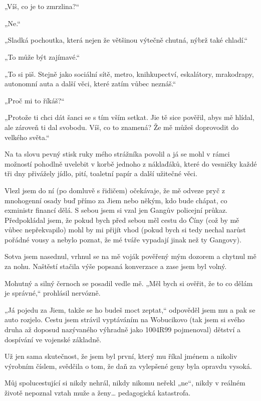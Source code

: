 \chapter{}

„Víš, co je to zmrzlina?“

„Ne.“

„Sladká pochoutka, která nejen že většinou výtečně chutná, nýbrž také chladí.“

„To může být zajímavé.“

„To si piš. Stejně jako sociální sítě, metro, knihkupectví, eskalátory, mrakodrapy, autonomní auta a další věci, které zatím vůbec neznáš.“

„Proč mi to říkáš?“

„Protože ti chci dát šanci se s tím vším setkat. Jie tě sice pověřil, abys mě hlídal, ale zároveň ti dal svobodu. Víš, co to znamená? Že mě můžeš doprovodit do velkého světa.“

Na ta slovu pevný stisk ruky mého strážníka povolil a já se mohl v rámci možností pohodlně uvelebit v korbě jednoho z náklaďáků, které do vesničky každé tři dny přivážely jídlo, pití, toaletní papír a další užitečné věci.

Vlezl jsem do ní (po domluvě s řidičem) očekávaje, že mě odveze pryč z mnohogenní osady buď přímo za Jiem nebo někým, kdo bude chápat, co exministr financí dělá. S sebou jsem si vzal jen Gangův policejní průkaz. Předpokládal jsem, že pokud bych před sebou měl cestu do Číny (což by mě vůbec nepřekvapilo) mohl by mi přijít vhod (pokud bych si tedy nechal narůst pořádné vousy a nebylo poznat, že mé tváře vypadají jinak než ty Gangovy).

Sotva jsem nasednul, vrhnul se na mě voják pověřený mým dozorem a chytnul mě za nohu. Naštěstí stačila výše popsaná konverzace a zase jsem byl volný.

Mohutný a silný černoch se posadil vedle mě. „Měl bych si ověřit, že to co dělám je správné,“ prohlásil nervózně.

„Já pojedu za Jiem, takže se ho budeš moct zeptat,“ odpověděl jsem mu a pak se auto rozjelo. Cestu jsem strávil vyptáváním na Wobucikovo (tak jsem si svého druha až doposud nazývaného výhradně jako 1004R99 pojmenoval) dětství a dospívání ve vojenské základně.

Už jen sama skutečnost, že jsem byl první, který mu říkal jménem a nikoliv výrobním číslem, svědčila o tom, že daň za vylepšené geny byla opravdu vysoká.

Můj spolucestující si nikdy nehrál, nikdy nikomu neřekl „ne“, nikdy v reálném životě nepoznal vztah muže a ženy… pedagogická katastrofa.

